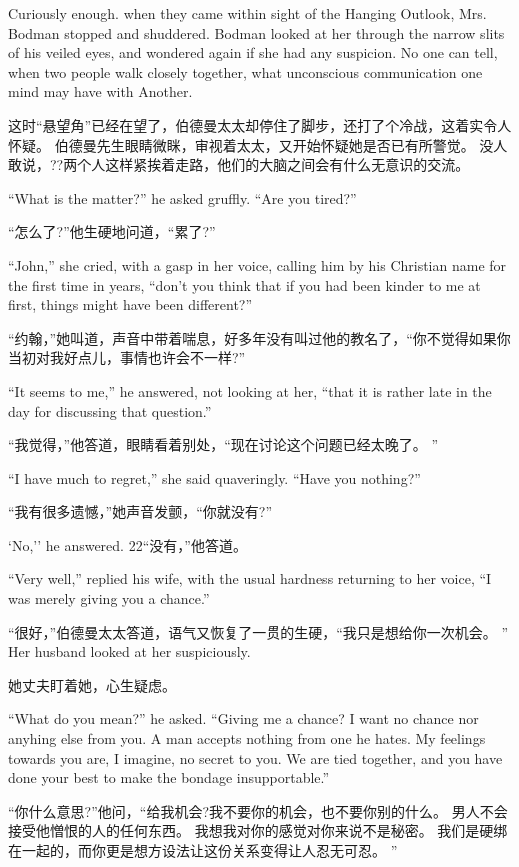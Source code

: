 \documentclass[cs4size, a4paper, 12pt]{article}
\newcounter{numpar}
\newcommand*{\newpar}{\numpar{}}
\begin{document}
	\newpar Curiously enough. when they came within sight of the Hanging Outlook, Mrs. Bodman stopped and shuddered. Bodman looked at her through the narrow slits of his veiled eyes, and wondered again if she had any suspicion. No one can tell, when two people walk closely together, what unconscious communication one mind may have with Another.
	
	这时``悬望角''已经在望了，伯德曼太太却停住了脚步，还打了个冷战，这着实令人怀疑。 伯德曼先生眼睛微眯，审视着太太，又开始怀疑她是否已有所警觉。 没人敢说，??两个人这样紧挨着走路，他们的大脑之间会有什么无意识的交流。 
	
	\newpar ``What is the matter?'' he asked gruffly. ``Are you tired?''
	
	``怎么了?''他生硬地问道，``累了?''
	
	\newpar ``John,'' she cried, with a gasp in her voice, calling him by his Christian name for the first time in years, ``don't you think that if you had been kinder to me at first, things might have been different?''
	
	``约翰，''她叫道，声音中带着喘息，好多年没有叫过他的教名了，``你不觉得如果你当初对我好点儿，事情也许会不一样?''
	
	\newpar ``It seems to me,'' he answered, not looking at her, ``that it is rather late in the day for discussing that question.''
	
	``我觉得，''他答道，眼睛看着别处，``现在讨论这个问题已经太晚了。 ''
	
	``I have much to regret,'' she said quaveringly. ``Have you nothing?''
	
	``我有很多遗憾，''她声音发颤，``你就没有?''
	
	`No,'' he answered. 22``没有，''他答道。 
	
	\newpar ``Very well,'' replied his wife, with the usual hardness returning to her voice, ``I was merely giving you a chance.''
	
	``很好，''伯德曼太太答道，语气又恢复了一贯的生硬，``我只是想给你一次机会。 '' Her husband looked at her suspiciously.
	
	她丈夫盯着她，心生疑虑。 
	
	\newpar ``What do you mean?'' he asked. ``Giving me a chance? I want no chance nor anyhing else from you. A man accepts nothing from one he hates. My feelings towards you are, I imagine, no secret to you. We are tied together, and you have done your best to make the bondage insupportable.''
	
	``你什么意思?''他问，``给我机会?我不要你的机会，也不要你别的什么。 男人不会接受他憎恨的人的任何东西。 我想我对你的感觉对你来说不是秘密。 我们是硬绑在一起的，而你更是想方设法让这份关系变得让人忍无可忍。 ''
	
\end{document}
